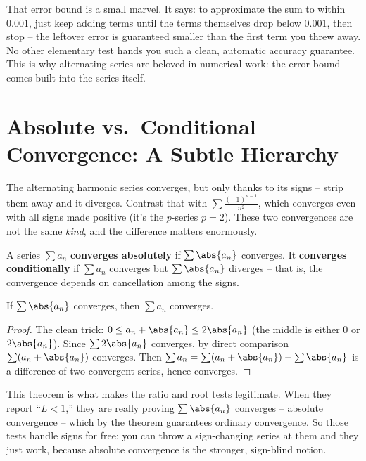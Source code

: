 \begin{aestheticbox}
That error bound is a small marvel. It says: to approximate the sum to within $0.001$, just keep adding terms until the terms themselves drop below $0.001$, then stop -- the leftover error is guaranteed smaller than the first term you threw away. No other elementary test hands you such a clean, automatic accuracy guarantee. This is why alternating series are beloved in numerical work: the error bound comes built into the series itself.
\end{aestheticbox}

\section{Absolute vs.\ Conditional Convergence: A Subtle Hierarchy}
\label{ch29:absolute}

The alternating harmonic series converges, but only thanks to its signs -- strip them away and it diverges. Contrast that with $\sum \tfrac{(-1)^{n-1}}{n^2}$, which converges even with all signs made positive (it's the $p$-series $p=2$). These two convergences are not the same \emph{kind}, and the difference matters enormously.

\begin{definition}
\label{ch29:def-absolute}
A series $\sum a_n$ \textbf{converges absolutely} if $\sum \abs{a_n}$ converges. It \textbf{converges conditionally} if $\sum a_n$ converges but $\sum \abs{a_n}$ diverges -- that is, the convergence depends on cancellation among the signs.
\end{definition}

\begin{theorem}
\label{ch29:thm-abs-implies}
If $\sum \abs{a_n}$ converges, then $\sum a_n$ converges.
\end{theorem}

\begin{proof}
The clean trick: $0 \le a_n + \abs{a_n} \le 2\abs{a_n}$ (the middle is either $0$ or $2\abs{a_n}$). Since $\sum 2\abs{a_n}$ converges, by direct comparison $\sum (a_n + \abs{a_n})$ converges. Then $\sum a_n = \sum (a_n + \abs{a_n}) - \sum \abs{a_n}$ is a difference of two convergent series, hence converges.
\end{proof}

\begin{focusbox}
This theorem is what makes the ratio and root tests legitimate. When they report ``$L<1$,'' they are really proving $\sum\abs{a_n}$ converges -- absolute convergence -- which by the theorem guarantees ordinary convergence. So those tests handle signs for free: you can throw a sign-changing series at them and they just work, because absolute convergence is the stronger, sign-blind notion.
\end{focusbox}

